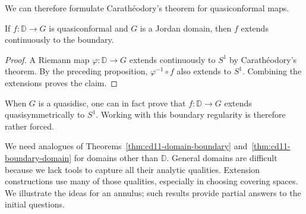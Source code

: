 \documentclass[11pt,a4paper]{article}
\begin{document}
We can therefore formulate Carath\'eodory's theorem for quasiconformal maps.
\setcounter{theorem}{44}\begin{theorem}
If \(f:\mathbb D\to G\) is quasiconformal and \(G\) is a Jordan domain, then \(f\) extends continuously to the boundary.
\end{theorem}
\begin{proof}
A Riemann map \(\varphi:\mathbb D\to G\) extends continuously to \(S^1\) by Carath\'eodory's theorem. By the preceding proposition, \(\varphi^{-1}\circ f\) also extends to \(S^1\). Combining the extensions proves the claim.
\end{proof}
When $G$ is a quasidisc, one can in fact prove that \(f:\mathbb D\to G\) extends quasisymmetrically to \(S^1\). Working with this boundary regularity is therefore rather forced.

We need analogues of Theorems~\ref{thm:cd11-domain-boundary} and~\ref{thm:cd11-boundary-domain} for domains other than \(\mathbb D\). General domains are difficult because we lack tools to capture all their analytic qualities. Extension constructions use many of those qualities, especially in choosing covering spaces. We illustrate the ideas for an annulus; such results provide partial answers to the initial questions.
\end{document}
